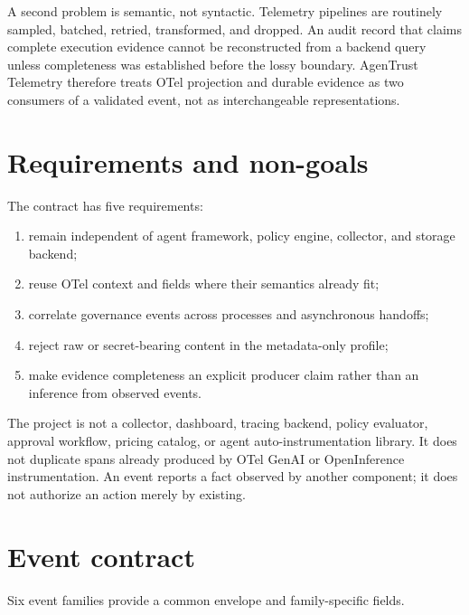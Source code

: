 \documentclass[10pt,letterpaper]{article}
\begin{document}
A second problem is semantic, not syntactic. Telemetry pipelines are routinely sampled, batched, retried, transformed, and dropped. An audit record that claims complete execution evidence cannot be reconstructed from a backend query unless completeness was established before the lossy boundary. AgenTrust Telemetry therefore treats OTel projection and durable evidence as two consumers of a validated event, not as interchangeable representations.

\section{Requirements and non-goals}

The contract has five requirements:

\begin{enumerate}[leftmargin=*]
  \item remain independent of agent framework, policy engine, collector, and storage backend;
  \item reuse OTel context and fields where their semantics already fit;
  \item correlate governance events across processes and asynchronous handoffs;
  \item reject raw or secret-bearing content in the metadata-only profile;
  \item make evidence completeness an explicit producer claim rather than an inference from observed events.
\end{enumerate}

The project is not a collector, dashboard, tracing backend, policy evaluator, approval workflow, pricing catalog, or agent auto-instrumentation library. It does not duplicate spans already produced by OTel GenAI or OpenInference instrumentation. An event reports a fact observed by another component; it does not authorize an action merely by existing.

\section{Event contract}

Six event families provide a common envelope and family-specific fields.
\end{document}
